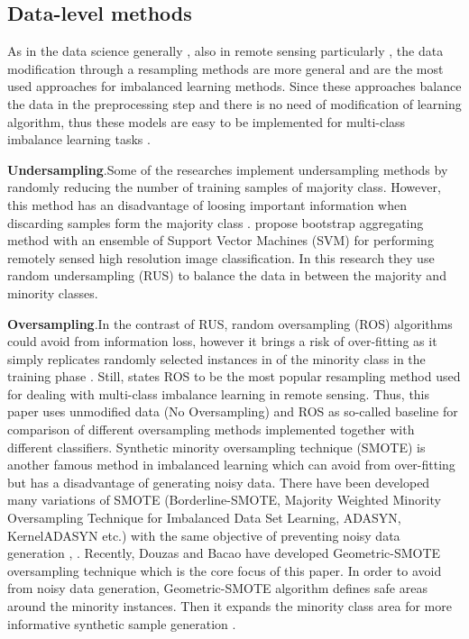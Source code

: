 \documentclass[parskip=full]{scrartcl}
\begin{document}
\subsection{Data-level methods}
As in the data science generally \cite{Douzas2019}, also in remote sensing
particularly \cite{Feng2019}, the data modification through a resampling methods
are more general and are the most used approaches for imbalanced learning
methods. Since these approaches balance the data in the preprocessing step and
there is no need of modification of learning algorithm, thus these models are
easy to be implemented for multi-class imbalance learning tasks \cite{Feng2019}.


\textbf{Undersampling}.Some of the researches implement undersampling methods by
randomly reducing the number of training samples of majority class. However,
this method has an disadvantage of loosing important information when discarding
samples form the majority class \cite{Feng2019}. \cite{Waske2009} propose
bootstrap aggregating method with an ensemble of Support Vector Machines (SVM)
for performing remotely sensed high resolution image classification. In this
research they use random undersampling (RUS) to balance the data in between the
majority and minority classes.

\textbf{Oversampling}.In the contrast of RUS, random oversampling (ROS)
algorithms could avoid from information loss, however it brings a risk of
over-fitting as it simply replicates randomly selected instances in of the
minority class in the training phase \cite{Douzas2019}. Still, \cite{Feng2019}
states ROS to be the most popular resampling method used for dealing with
multi-class imbalance learning in remote sensing. Thus, this paper uses
unmodified data (No Oversampling) and ROS as so-called baseline for comparison
of different oversampling methods implemented together with different
classifiers. Synthetic minority oversampling technique (SMOTE) is another famous
method in imbalanced learning which can avoid from over-fitting but has a
disadvantage of generating noisy data. There have been developed many variations
of SMOTE (Borderline-SMOTE, Majority Weighted Minority Oversampling Technique
for Imbalanced Data Set Learning, ADASYN, KernelADASYN etc.) with the same
objective of preventing noisy data generation \cite{Douzas2019},
\cite{Feng2019}. Recently, Douzas and Bacao have developed Geometric-SMOTE
oversampling technique which is the core focus of this paper. In order to avoid
from noisy data generation, Geometric-SMOTE algorithm defines safe areas around
the minority instances. Then it expands the minority class area for more
informative synthetic sample generation \cite{Douzas2019}. 
\end{document}
